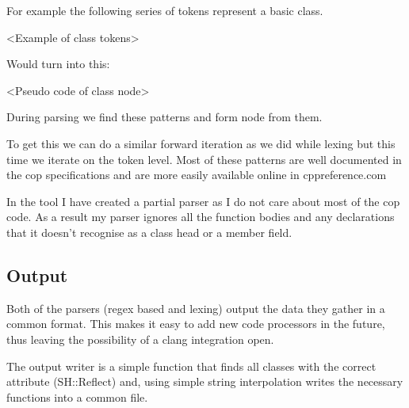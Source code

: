 For example the following series of tokens represent a basic class.

<Example of class tokens>

Would turn into this:

<Pseudo code of class node>

During parsing we find these patterns and form node from them.

To get this we can do a similar forward iteration as we did while lexing but this time we iterate on the token level.
Most of these patterns are well documented in the cop specifications and are more easily available online in cppreference.com

In the tool I have created a partial parser as I do not care about most of the cop code.
As a result my parser ignores all the function bodies and any declarations that it doesn't recognise as a class head or a member field.

\subsection{Output}
Both of the parsers (regex based and lexing) output the data they gather in a common format.
This makes it easy to add new code processors in the future, thus leaving the possibility of a clang integration open.

The output writer is a simple function that finds all classes with the correct attribute (SH::Reflect) and,
using simple string interpolation writes the necessary functions into a common file.
